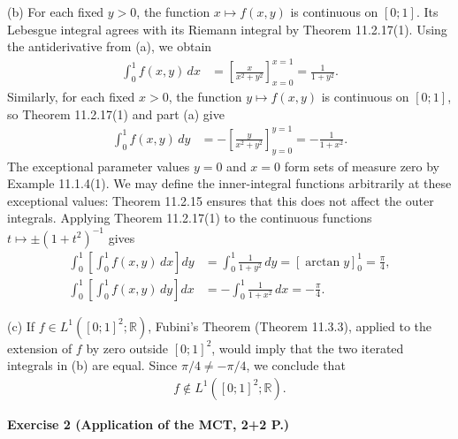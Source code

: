 \documentclass[12pt,a4paper]{article}
\begin{document}
(b) For each fixed $y>0$, the function $x\mapsto f(x,y)$ is continuous on $[0;1]$. Its Lebesgue integral agrees with its Riemann integral by Theorem 11.2.17(1). Using the antiderivative from (a), we obtain
\begin{align*}
\int_0^1 f(x,y)\,dx
&=\left[\frac{x}{x^2+y^2}\right]_{x=0}^{x=1}
=\frac{1}{1+y^2}.
\end{align*}
Similarly, for each fixed $x>0$, the function $y\mapsto f(x,y)$ is continuous on $[0;1]$, so Theorem 11.2.17(1) and part (a) give
\begin{align*}
\int_0^1 f(x,y)\,dy
&=-\left[\frac{y}{x^2+y^2}\right]_{y=0}^{y=1}
=-\frac{1}{1+x^2}.
\end{align*}
The exceptional parameter values $y=0$ and $x=0$ form sets of measure zero by Example 11.1.4(1). We may define the inner-integral functions arbitrarily at these exceptional values: Theorem 11.2.15 ensures that this does not affect the outer integrals. Applying Theorem 11.2.17(1) to the continuous functions $t\mapsto\pm(1+t^2)^{-1}$ gives
\begin{align*}
\int_0^1\left[\int_0^1 f(x,y)\,dx\right]dy
&=\int_0^1\frac{1}{1+y^2}\,dy
=\left[\arctan y\right]_0^1
=\frac{\pi}{4},\\
\int_0^1\left[\int_0^1 f(x,y)\,dy\right]dx
&=-\int_0^1\frac{1}{1+x^2}\,dx
=-\frac{\pi}{4}.
\end{align*}

(c) If $f\in L^1([0;1]^2;\mathbb{R})$, Fubini's Theorem (Theorem 11.3.3), applied to the extension of $f$ by zero outside $[0;1]^2$, would imply that the two iterated integrals in (b) are equal. Since $\pi/4\neq-\pi/4$, we conclude that
\begin{align*}
f\notin L^1([0;1]^2;\mathbb{R}).
\end{align*}

\newpage
\textbf{Exercise 2 (Application of the MCT, 2+2 P.)}
\end{document}
